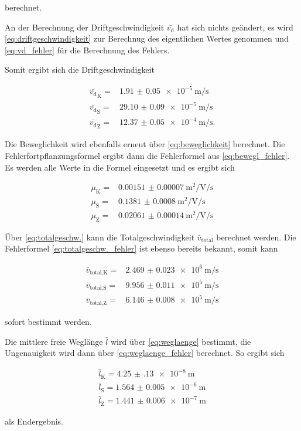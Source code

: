 berechnet.

An der Berechnung der Driftgeschwindigkeit $\bar{v_\text{d}}$ hat sich nichts geändert, es wird \autoref{eq:driftgeschwindigkeit} zur Berechnug des eigentlichen Wertes genommen und \autoref{eq:vd_fehler} für die Berechnung des Fehlers.

Somit ergibt sich die Driftgeschwindigkeit

\begin{align}
    \bar{v_\text{d}}_\text{K} =& \SI{1.91(5)e-5}{\meter\per\second} \\
    \bar{v_\text{d}}_\text{S} =& \SI{29.10(9)e-5}{\meter\per\second} \\
    \bar{v_\text{d}}_\text{Z} =& \SI{12.37(5)e-4}{\meter\per\second}.
    \label{eq:vd2}
\end{align}

Die Beweglichkeit wird ebenfalls erneut über \autoref{eq:beweglichkeit} berechnet.
Die Fehlerfortpflanzungsformel ergibt dann die Fehlerformel aus \autoref{eq:bewegl_fehler}.
Es werden alle Werte in die Formel eingesetzt und es ergibt sich 

\begin{align}
    \mu _\text{K} =& \SI{0.00151(7)}{\meter\squared\per\volt\per\second}\\
    \mu _\text{S} =& \SI{0.1381(8)}{\meter\squared\per\volt\per\second}\\
    \mu _\text{Z} =& \SI{0.02061(14)}{\meter\squared\per\volt\per\second}
    \label{eq:mue2}
\end{align}

Über \autoref{eq:totalgeschw.} kann die Totalgeschwindigkeit $\bar{v}_\text{total}$ berechnet werden.
Die Fehlerformel \autoref{eq:totalgeschw._fehler} ist ebenso bereits bekannt, somit kann 

\begin{align}
    \bar{v}_\text{total,K} =& \SI{2.469(23)e6}{\meter\per\second}\\
    \bar{v}_\text{total,S} =& \SI{9.956(11)e5}{\meter\per\second}\\
    \bar{v}_\text{total,Z} =& \SI{6.146(8)e5}{\meter\per\second}
    \label{eq:vtotal2}
\end{align}

sofort bestimmt werden.

Die mittlere freie Weglänge $\bar{l}$ wird über \autoref{eq:weglaenge} bestimmt, die Ungenauigkeit wird dann über \autoref{eq:weglaenge_fehler} berechnet.
So ergibt sich

\begin{align}
    \bar{l}_\text{K} = \SI{4.25(13)e-8}{\meter}\\
    \bar{l}_\text{S} = \SI{1.564(5)e-6}{\meter}\\
    \bar{l}_\text{Z} = \SI{1.441(6)e-7}{\meter}
    \label{eq:weglaenge2}
\end{align}

als Endergebnis.